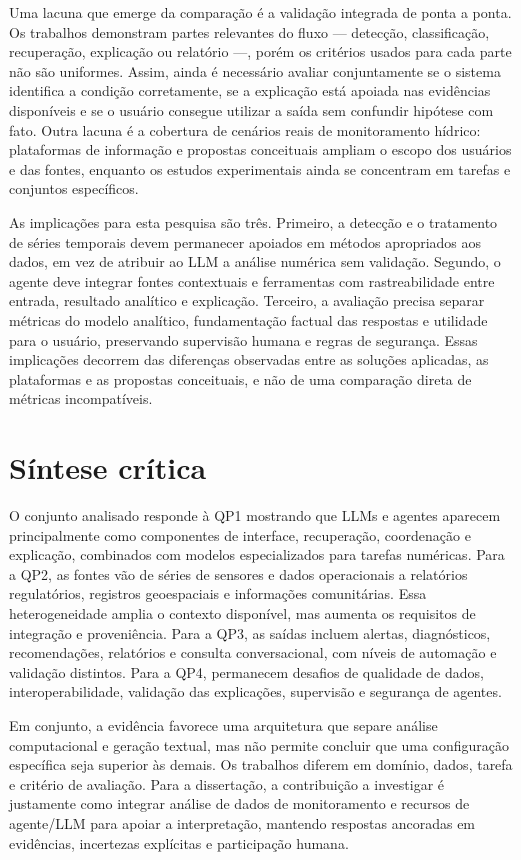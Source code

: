 Uma lacuna que emerge da comparação é a validação integrada de ponta a ponta. Os trabalhos demonstram partes relevantes do fluxo — detecção, classificação, recuperação, explicação ou relatório —, porém os critérios usados para cada parte não são uniformes. Assim, ainda é necessário avaliar conjuntamente se o sistema identifica a condição corretamente, se a explicação está apoiada nas evidências disponíveis e se o usuário consegue utilizar a saída sem confundir hipótese com fato. Outra lacuna é a cobertura de cenários reais de monitoramento hídrico: plataformas de informação e propostas conceituais ampliam o escopo dos usuários e das fontes, enquanto os estudos experimentais ainda se concentram em tarefas e conjuntos específicos.

As implicações para esta pesquisa são três. Primeiro, a detecção e o tratamento de séries temporais devem permanecer apoiados em métodos apropriados aos dados, em vez de atribuir ao LLM a análise numérica sem validação. Segundo, o agente deve integrar fontes contextuais e ferramentas com rastreabilidade entre entrada, resultado analítico e explicação. Terceiro, a avaliação precisa separar métricas do modelo analítico, fundamentação factual das respostas e utilidade para o usuário, preservando supervisão humana e regras de segurança. Essas implicações decorrem das diferenças observadas entre as soluções aplicadas, as plataformas e as propostas conceituais, e não de uma comparação direta de métricas incompatíveis.

\section{Síntese crítica}
\label{sec:ea-sintese}

O conjunto analisado responde à QP1 mostrando que LLMs e agentes aparecem principalmente como componentes de interface, recuperação, coordenação e explicação, combinados com modelos especializados para tarefas numéricas. Para a QP2, as fontes vão de séries de sensores e dados operacionais a relatórios regulatórios, registros geoespaciais e informações comunitárias. Essa heterogeneidade amplia o contexto disponível, mas aumenta os requisitos de integração e proveniência. Para a QP3, as saídas incluem alertas, diagnósticos, recomendações, relatórios e consulta conversacional, com níveis de automação e validação distintos. Para a QP4, permanecem desafios de qualidade de dados, interoperabilidade, validação das explicações, supervisão e segurança de agentes.

Em conjunto, a evidência favorece uma arquitetura que separe análise computacional e geração textual, mas não permite concluir que uma configuração específica seja superior às demais. Os trabalhos diferem em domínio, dados, tarefa e critério de avaliação. Para a dissertação, a contribuição a investigar é justamente como integrar análise de dados de monitoramento e recursos de agente/LLM para apoiar a interpretação, mantendo respostas ancoradas em evidências, incertezas explícitas e participação humana.
